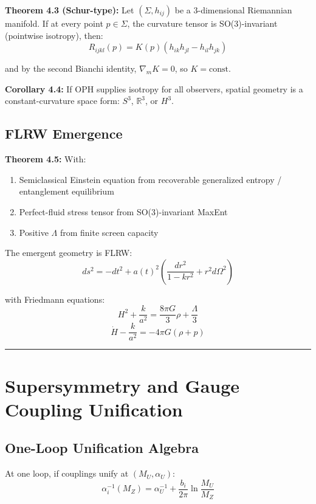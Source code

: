 \textbf{Theorem 4.3 (Schur-type):} Let \((\Sigma, h_{ij})\) be a 3-dimensional Riemannian manifold. If at every point \(p \in \Sigma\), the curvature tensor is SO(3)-invariant (pointwise isotropy), then: \[R_{ijkl}(p) = K(p)(h_{ik}h_{jl} - h_{il}h_{jk})\]

and by the second Bianchi identity, \(\nabla_m K = 0\), so \(K = \text{const}\).

\textbf{Corollary 4.4:} If OPH supplies isotropy for all observers, spatial geometry is a constant-curvature space form: \(S^3\), \(\mathbb{R}^3\), or \(H^3\).

\subsection{FLRW Emergence}\label{44-flrw-emergence}

\textbf{Theorem 4.5:} With:

\begin{enumerate}
\def\labelenumi{\arabic{enumi}.}
\tightlist
\item
 Semiclassical Einstein equation from recoverable generalized entropy / entanglement equilibrium
\item
 Perfect-fluid stress tensor from SO(3)-invariant MaxEnt
\item
 Positive \(\Lambda\) from finite screen capacity
\end{enumerate}

The emergent geometry is FLRW: \[ds^2 = -dt^2 + a(t)^2 \left(\frac{dr^2}{1-kr^2} + r^2 d\Omega^2\right)\]

with Friedmann equations: \[H^2 + \frac{k}{a^2} = \frac{8\pi G}{3}\rho + \frac{\Lambda}{3}\] \[\dot{H} - \frac{k}{a^2} = -4\pi G(\rho + p)\]

\begin{center}\rule{0.5\linewidth}{0.5pt}\end{center}

\section{Supersymmetry and Gauge Coupling Unification}\label{5-supersymmetry-and-gauge-coupling-unification}

\subsection{One-Loop Unification Algebra}\label{51-one-loop-unification-algebra}

At one loop, if couplings unify at \((M_U, \alpha_U)\): \[\alpha_i^{-1}(M_Z) = \alpha_U^{-1} + \frac{b_i}{2\pi}\ln\frac{M_U}{M_Z}\]

